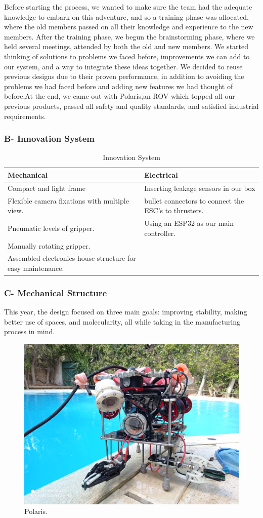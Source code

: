 \documentclass[a4paper,12pt,leqno]{report}
\begin{document}
Before starting the process, we wanted to make sure the team had the adequate knowledge to embark on this adventure, and so a training phase was allocated, where the old members  passed on all their knowledge and experience to the new members. 
After the training phase, we begun the brainstorming phase, where we held several meetings,  attended by both the old and new members. We started thinking of solutions to problems we faced before, improvements we can add to our system, and a way to integrate these ideas  together. We decided to reuse previous designs due to their proven performance, in addition to  avoiding the problems we had faced before and adding new features we had thought of before,At the end, we came out with Polaris,\linebreak  an ROV which topped all our previous products, passed  all safety and quality standards, and satisfied industrial requirements.
\\
\textcolor{blue!40}{
\subsubsection{B- Innovation System }}
\begin{table}[H]
	\centering
\caption{Innovation System }
\begin{tabular}{|p{7cm}|p{7cm}|}
	\hline
\textcolor{red!80}{Mechanical}&\textcolor{red!80}{Electrical}\\ \hline
	Compact and light frame & Inserting leakage sensors in our box \\ \hline
	Flexible camera fixations with multiple view.&bullet connectors to connect the ESC’s to thrusters. \\ \hline 
	Pneumatic levels of gripper. & Using an ESP32 as our main controller.\\ \hline
	Manually rotating gripper. &\\ \hline
	Assembled electronics house structure  for easy maintenance.& \\ \hline
\end{tabular}
\end{table}
\textcolor{blue!40}{
\subsubsection{C- Mechanical Structure}}
This year, the design focused on three main goals: improving stability,  making better use of spaces, and molecularity, all while taking in the manufacturing process in mind.\\
	\begin{figure}
		\includegraphics[width= .4\textwidth,height= .16\textheight]{Isometric view-1}
		\caption{Polaris.}
	\end{figure} 
\end{document}
